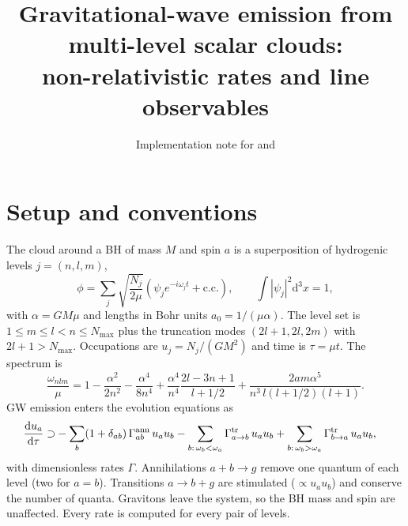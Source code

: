 \documentclass[11pt]{article}
\title{Gravitational-wave emission from multi-level scalar clouds:\\ non-relativistic rates and line observables}
\author{Implementation note for \code{src/Numerics/gw_rates.jl} and \code{cloud_shifts.jl}}
\date{}
\newcommand{\dd}{\mathrm{d}}
\begin{document}
\maketitle

\section{Setup and conventions}
The cloud around a BH of mass $M$ and spin $a$ is a superposition of hydrogenic levels $j=(n,l,m)$,
\begin{equation}
\phi = \sum_j \sqrt{\frac{N_j}{2\mu}}\left(\psi_j e^{-i\omega_j t} + \mathrm{c.c.}\right),\qquad \int|\psi_j|^2\dd^3x=1,
\end{equation}
with $\alpha = GM\mu$ and lengths in Bohr units $a_0=1/(\mu\alpha)$. The level set is $1\le m\le l<n\le N_{\max}$ plus the truncation modes $(2l+1,2l,2m)$ with $2l+1>N_{\max}$. Occupations are $u_j=N_j/(GM^2)$ and time is $\tau=\mu t$. The spectrum is
\begin{equation}
\frac{\omega_{nlm}}{\mu} = 1-\frac{\alpha^2}{2n^2}-\frac{\alpha^4}{8n^4}+\frac{\alpha^4}{n^4}\frac{2l-3n+1}{l+1/2}+\frac{2am\alpha^5}{n^3\,l(l+1/2)(l+1)} .
\label{eq:spectrum}
\end{equation}
GW emission enters the evolution equations as
\begin{align}
\frac{\dd u_a}{\dd\tau}\supset &-\sum_b (1+\delta_{ab})\,\Gamma^{\rm ann}_{ab}\,u_a u_b
-\sum_{b:\,\omega_b<\omega_a}\Gamma^{\rm tr}_{a\to b}\,u_a u_b+\sum_{b:\,\omega_b>\omega_a}\Gamma^{\rm tr}_{b\to a}\,u_a u_b ,
\end{align}
with dimensionless rates $\Gamma$. Annihilations $a+b\to g$ remove one quantum of each level (two for $a=b$). Transitions $a\to b+g$ are stimulated ($\propto u_a u_b$) and conserve the number of quanta. Gravitons leave the system, so the BH mass and spin are unaffected. Every rate is computed for every pair of levels.
\end{document}
